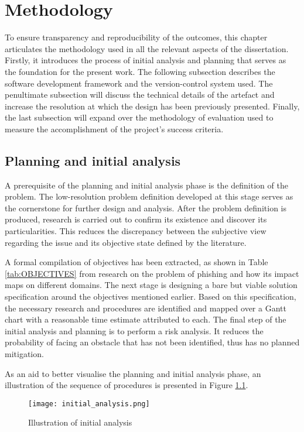 \chapter{Methodology}
\label{chap:methodology}
To ensure transparency and reproducibility of the outcomes, this chapter articulates the methodology used in all the relevant aspects of the dissertation.
Firstly, it introduces the process of initial analysis and planning that serves as the foundation for the present work. The following subsection describes the software development framework and the version-control system used. The penultimate subsection will discuss the technical details of the artefact and increase the resolution at which the design has been previously presented. Finally, the last subsection will expand over the methodology of evaluation used to measure the accomplishment of the project's success criteria.

\section{Planning and initial analysis}
A prerequisite of the planning and initial analysis phase is the definition of the problem. The low-resolution problem definition developed at this stage serves as the cornerstone for further design and analysis. After the problem definition is produced, research is carried out to confirm its existence and discover its particularities. This reduces the discrepancy between the subjective view regarding the issue and its objective state defined by the literature.

A formal compilation of objectives has been extracted, as shown in Table \ref{tab:OBJECTIVES} from research on the problem of phishing and how its impact maps on different domains. The next stage is designing a bare but viable solution specification around the objectives mentioned earlier. Based on this specification, the necessary research and procedures are identified and mapped over a Gantt chart with a reasonable time estimate attributed to each. The final step of the initial analysis and planning is to perform a risk analysis. It reduces the probability of facing an obstacle that has not been identified, thus has no planned mitigation.

As an aid to better visualise the planning and initial analysis phase, an illustration of the sequence of procedures is presented in Figure \ref{fig:INITIAL_ANALYSIS}.

\begin{figure}
	\centering
	\texttt{[image: initial\_analysis.png]}
	\caption{Illustration of initial analysis}
	\label{fig:INITIAL_ANALYSIS}
\end{figure}

